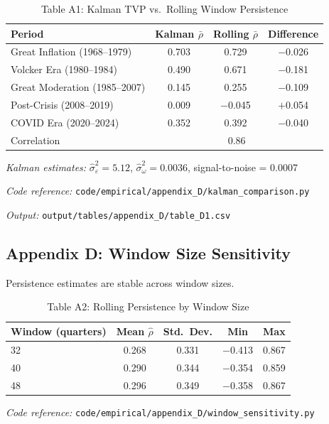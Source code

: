 \documentclass[11pt]{article}
\begin{document}
\begin{table}[htbp]
\centering
\caption{Table A1: Kalman TVP vs.\ Rolling Window Persistence}
\label{tab:kalman_comparison}
\begin{threeparttable}
\begin{tabular}{lccc}
\toprule
Period & Kalman $\bar{\rho}$ & Rolling $\bar{\rho}$ & Difference \\
\midrule
Great Inflation (1968--1979) & 0.703 & 0.729 & $-$0.026 \\
Volcker Era (1980--1984) & 0.490 & 0.671 & $-$0.181 \\
Great Moderation (1985--2007) & 0.145 & 0.255 & $-$0.109 \\
Post-Crisis (2008--2019) & 0.009 & $-$0.045 & $+$0.054 \\
COVID Era (2020--2024) & 0.352 & 0.392 & $-$0.040 \\
\midrule
Correlation & \multicolumn{3}{c}{0.86} \\
\bottomrule
\end{tabular}
\begin{tablenotes}
\small
\item \textit{Kalman estimates:} $\hat{\sigma}^2_\varepsilon = 5.12$, $\hat{\sigma}^2_\omega = 0.0036$, signal-to-noise = 0.0007
\item \textit{Code reference:} \texttt{code/empirical/appendix\_D/kalman\_comparison.py}
\item \textit{Output:} \texttt{output/tables/appendix\_D/table\_D1.csv}
\end{tablenotes}
\end{threeparttable}
\end{table}

\subsection{Appendix D: Window Size Sensitivity}

Persistence estimates are stable across window sizes.

\begin{table}[htbp]
\centering
\caption{Table A2: Rolling Persistence by Window Size}
\label{tab:window_sensitivity}
\begin{threeparttable}
\begin{tabular}{lcccc}
\toprule
Window (quarters) & Mean $\hat{\rho}$ & Std.\ Dev. & Min & Max \\
\midrule
32 & 0.268 & 0.331 & $-$0.413 & 0.867 \\
40 & 0.290 & 0.344 & $-$0.354 & 0.859 \\
48 & 0.296 & 0.349 & $-$0.358 & 0.867 \\
\bottomrule
\end{tabular}
\begin{tablenotes}
\small
\item \textit{Code reference:} \texttt{code/empirical/appendix\_D/window\_sensitivity.py}
\end{tablenotes}
\end{threeparttable}
\end{table}
\end{document}
